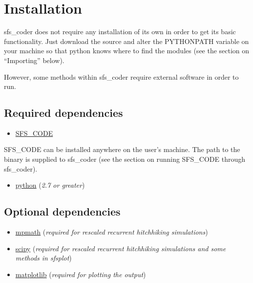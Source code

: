 \documentclass[letterpaper,10pt,english]{sphinxmanual}
\begin{document}
\chapter{Installation}
\label{rstfiles/install:installation}\label{rstfiles/install::doc}
sfs\_coder does not require any installation of its own in order
to get its basic functionality.  Just download the source and alter the
PYTHONPATH variable on your machine so that python knows where to find the
modules (see the section on ``Importing'' below).

However, some methods within sfs\_coder require external software in order to
run.


\section{Required dependencies}
\label{rstfiles/install:required-dependencies}\begin{itemize}
\item {} 
\href{http://sfscode.sourceforge.net}{SFS\_CODE}

\end{itemize}

SFS\_CODE can be installed anywhere on the user's machine. The path
to the binary is supplied to sfs\_coder (see the section on
running SFS\_CODE through sfs\_coder).
\begin{itemize}
\item {} 
\href{https://www.python.org}{python} (\emph{2.7 or greater})

\end{itemize}


\section{Optional dependencies}
\label{rstfiles/install:optional-dependencies}\begin{itemize}
\item {} 
\href{https://code.google.com/p/mpmath/}{mpmath} (\emph{required for rescaled recurrent hitchhiking simulations})

\item {} 
\href{http://www.scipy.org/}{scipy} (\emph{required for rescaled recurrent hitchhiking simulations and some
methods in sfsplot})

\item {} 
\href{http://matplotlib.org/}{matplotlib} (\emph{required for plotting the output})

\end{itemize}
\end{document}
